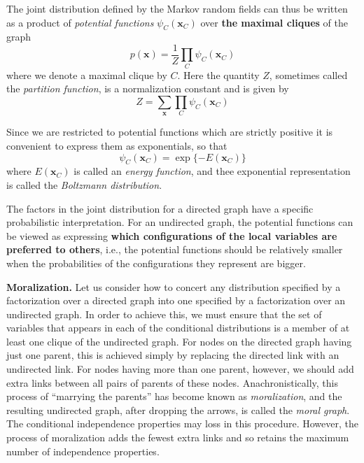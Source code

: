 \documentclass[a4paper]{book}
\renewcommand{\bf}{\mathbf}
\newcommand{\imp}[1]{\textit{#1}}
\begin{document}
The joint distribution defined by the Markov random fields can thus be written as a product of \imp{potential functions} $\psi_C(\bf{x}_C)$ over \textbf{the maximal cliques} of the graph
\begin{equation}
	p(\bf{x}) = \frac{1}{Z} \prod_C \psi_C(\bf{x}_C)
\end{equation}
where we denote a maximal clique by $C$. Here the quantity $Z$, sometimes called the \imp{partition function}, is a normalization constant and is given by
\begin{equation}
	Z = \sum_{\bf{x}} \prod_C \psi_C(\bf{x}_C)
\end{equation}

Since we are restricted to potential functions which are strictly positive it is convenient to express them as exponentials, so that
\begin{equation}
	\psi_C(\bf{x}_C) = \exp \{ -E(\bf{x}_C) \}
\end{equation}
where $E(\bf{x}_C)$ is called an \imp{energy function}, and thee exponential representation is called the \imp{Boltzmann distribution}.

The factors in the joint distribution for a directed graph have a specific probabilistic interpretation. For an undirected graph, the potential functions can be viewed as expressing \textbf{which configurations of the local variables are preferred to others}, i.e., the potential functions should be relatively smaller when the probabilities of the configurations they represent are bigger.

\textbf{Moralization.} Let us consider how to concert any distribution specified by a factorization over a directed graph into one specified by a factorization over an undirected graph. In order to achieve this, we must ensure that the set of variables that appears in each of the conditional distributions is a member of at least one clique of the undirected graph. For nodes on the directed graph having just one parent, this is achieved simply by replacing the directed link with an undirected link. For nodes having more than one parent, however, we should add extra links between all pairs of parents of these nodes. Anachronistically, this process of ``marrying the parents'' has become known as \imp{moralization}, and the resulting undirected graph, after dropping the arrows, is called the \imp{moral graph}. The conditional independence properties may loss in this procedure. However, the process of moralization adds the fewest extra links and so retains the maximum number of independence properties.
\end{document}
